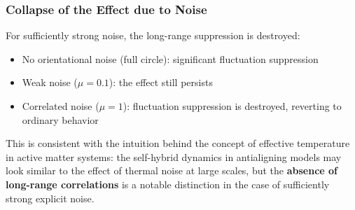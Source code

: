 \subsubsection{Collapse of the Effect due to Noise}

For sufficiently strong noise, the long-range suppression is destroyed:
\begin{itemize}
    \item No orientational noise (full circle): significant fluctuation suppression
    \item Weak noise ($\mu = 0.1$): the effect still persists
    \item Correlated noise ($\mu = 1$): fluctuation suppression is destroyed, reverting to ordinary behavior
\end{itemize}

This is consistent with the intuition behind the concept of effective temperature in active matter systems: the self-hybrid dynamics in antialigning models may look similar to the effect of thermal noise at large scales, but the \textbf{absence of long-range correlations} is a notable distinction in the case of sufficiently strong explicit noise.
